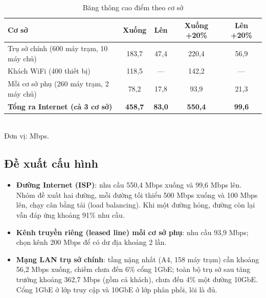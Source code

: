 \begin{table}[H]
    \centering
    \renewcommand{\arraystretch}{1.4}
    \begin{tabular}{p{5.6cm}cccc}
        \hline
        \textbf{Cơ sở} & \textbf{Xuống} & \textbf{Lên} & \textbf{Xuống +20\%} & \textbf{Lên +20\%} \\ \hline
        Trụ sở chính (600 máy trạm, 10 máy chủ) & 183,7 & 47,4 & 220,4 & 56,9 \\ \hline
        Khách WiFi (400 thiết bị) & 118,5 & --- & 142,2 & --- \\ \hline
        Mỗi cơ sở phụ (260 máy trạm, 2 máy chủ) & 78,2 & 17,8 & 93,9 & 21,3 \\ \hline
        \textbf{Tổng ra Internet (cả 3 cơ sở)} & \textbf{458,7} & \textbf{83,0} & \textbf{550,4} & \textbf{99,6} \\ \hline
    \end{tabular}
    \\[2pt] \small Đơn vị: Mbps.
    \caption{Băng thông cao điểm theo cơ sở}
\end{table}

\subsection{Đề xuất cấu hình}
\begin{itemize}
    \item \textbf{Đường Internet (ISP)}: nhu cầu 550,4 Mbps xuống và 99,6 Mbps lên. Nhóm đề xuất hai đường, mỗi đường tối thiểu 500 Mbps xuống và 100 Mbps lên, chạy cân bằng tải (load balancing). Khi một đường hỏng, đường còn lại vẫn đáp ứng khoảng 91\% nhu cầu.
    \item \textbf{Kênh truyền riêng (leased line) mỗi cơ sở phụ}: nhu cầu 93,9 Mbps; chọn kênh 200 Mbps để có dư địa khoảng 2 lần.
    \item \textbf{Mạng LAN trụ sở chính}: tầng nặng nhất (A4, 158 máy trạm) cần khoảng 56,2 Mbps xuống, chiếm chưa đến 6\% cổng 1GbE; toàn bộ trụ sở sau tăng trưởng khoảng 362,7 Mbps (gồm cả khách), chưa đến 4\% một đường 10GbE. Cổng 1GbE ở lớp truy cập và 10GbE ở lớp phân phối, lõi là đủ.
\end{itemize}